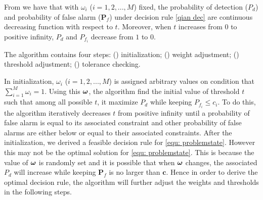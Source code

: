 From \cite{zhang2000efficient} we have that with $\omega_i$ ($i=1, 2, ..., M$) fixed, the probability of detection ($P_d$) and probability of false alarm ($\mathbf{P}_f$) under decision rule \eqref{qian dec} are continuous decreasing function with respect to $t$. 
Moreover, when $t$ increases from $0$ to positive infinity, $P_d$ and $P_{f_i}$ decrease from $1$ to $0$.

The algorithm contains four steps: () initialization; () weight adjustment; () threshold adjustment; () tolerance checking.

In initialization, $\omega_i$ ($i=1, 2, ..., M$)  is assigned arbitrary values on condition that $\sum_{i=1}^{M}\omega_i = 1$. Using this $\boldsymbol{\omega}$, the algorithm find the initial value of threshold $t$ such that among all possible $t$, it maximize $P_d$ while keeping $P_{f_i} \leq c_i$. 
To do this, the algorithm iteratively decreases $t$ from positive infinity until a probability of false alarm is equal to its associated constraint and other probability of false alarms are either below or equal to their associated constraints.   
After the initialization, we derived a feasible decision rule for \eqref{equ: problemstate}. However this may not be the optimal solution for \eqref{equ: problemstate}. This is because the value of $\boldsymbol{\omega}$ is randomly set and it is possible that when $\boldsymbol{\omega}$ changes, the associated $P_d$ will increase while keeping $\mathbf{P}_f$ is no larger than $\mathbf{c}$. Hence in order to derive the optimal decision rule, the algorithm will further adjust the weights and thresholds in the following steps. 

